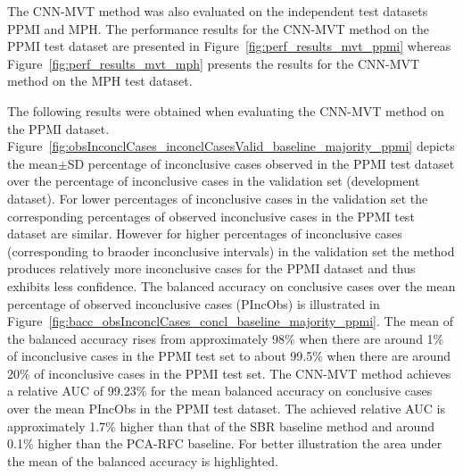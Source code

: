 The CNN-MVT method was also evaluated on the independent test datasets PPMI and MPH.
The performance results for the CNN-MVT method on the PPMI test dataset are presented in Figure~\ref{fig:perf_results_mvt_ppmi} 
whereas Figure~\ref{fig:perf_results_mvt_mph} presents the results for the CNN-MVT method on the MPH test dataset.




The following results were obtained when evaluating the CNN-MVT method on the PPMI dataset.
Figure~\ref{fig:obsInconclCases_inconclCasesValid_baseline_majority_ppmi} depicts the
mean$\pm$SD percentage of inconclusive cases observed in the PPMI test dataset 
over the percentage of inconclusive cases in the validation set (development dataset).
For lower percentages of inconclusive cases in the validation set the corresponding 
percentages of observed inconclusive cases in the PPMI test dataset are similar.
However for higher percentages of inconclusive cases (corresponding to braoder inconclusive intervals) 
in the validation set the method produces relatively more inconclusive cases for the PPMI dataset 
and thus exhibits less confidence.
The balanced accuracy on conclusive cases over the mean percentage of observed inconclusive cases (PIncObs) is illustrated 
in Figure~\ref{fig:bacc_obsInconclCases_concl_baseline_majority_ppmi}.
The mean of the balanced accuracy rises from approximately 98\% 
when there are around 1\% of inconclusive cases in the PPMI test set to about 99.5\% 
when there are around 20\% of inconclusive cases in the PPMI test set.
The CNN-MVT method achieves a relative AUC of 99.23\% for the mean balanced accuracy on conclusive cases 
over the mean PIncObs in the PPMI test dataset.
The achieved relative AUC is approximately 1.7\% higher than that of the SBR baseline method 
and around 0.1\% higher than the PCA-RFC baseline.
For better illustration the area under the mean of the balanced accuracy is highlighted.


